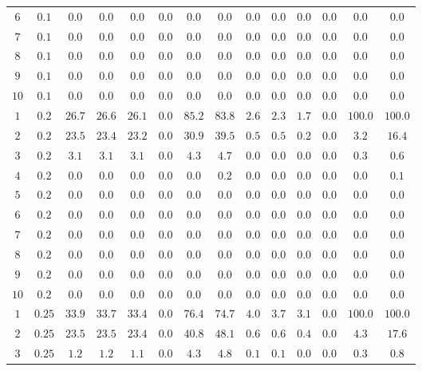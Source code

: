 \begin{tabular}{cccccccccccccc}
$6$ & $0.1$ & $0.0$ & $0.0$ & $0.0$ & $0.0$ & $0.0$ & $0.0$ & $0.0$ & $0.0$ & $0.0$ & $0.0$ & $0.0$ & $0.0$\\
$7$ & $0.1$ & $0.0$ & $0.0$ & $0.0$ & $0.0$ & $0.0$ & $0.0$ & $0.0$ & $0.0$ & $0.0$ & $0.0$ & $0.0$ & $0.0$\\
$8$ & $0.1$ & $0.0$ & $0.0$ & $0.0$ & $0.0$ & $0.0$ & $0.0$ & $0.0$ & $0.0$ & $0.0$ & $0.0$ & $0.0$ & $0.0$\\
$9$ & $0.1$ & $0.0$ & $0.0$ & $0.0$ & $0.0$ & $0.0$ & $0.0$ & $0.0$ & $0.0$ & $0.0$ & $0.0$ & $0.0$ & $0.0$\\
$10$ & $0.1$ & $0.0$ & $0.0$ & $0.0$ & $0.0$ & $0.0$ & $0.0$ & $0.0$ & $0.0$ & $0.0$ & $0.0$ & $0.0$ & $0.0$\\
$1$ & $0.2$ & $26.7$ & $26.6$ & $26.1$ & $0.0$ & $85.2$ & $83.8$ & $2.6$ & $2.3$ & $1.7$ & $0.0$ & $100.0$ & $100.0$\\
$2$ & $0.2$ & $23.5$ & $23.4$ & $23.2$ & $0.0$ & $30.9$ & $39.5$ & $0.5$ & $0.5$ & $0.2$ & $0.0$ & $3.2$ & $16.4$\\
$3$ & $0.2$ & $3.1$ & $3.1$ & $3.1$ & $0.0$ & $4.3$ & $4.7$ & $0.0$ & $0.0$ & $0.0$ & $0.0$ & $0.3$ & $0.6$\\
$4$ & $0.2$ & $0.0$ & $0.0$ & $0.0$ & $0.0$ & $0.0$ & $0.2$ & $0.0$ & $0.0$ & $0.0$ & $0.0$ & $0.0$ & $0.1$\\
$5$ & $0.2$ & $0.0$ & $0.0$ & $0.0$ & $0.0$ & $0.0$ & $0.0$ & $0.0$ & $0.0$ & $0.0$ & $0.0$ & $0.0$ & $0.0$\\
$6$ & $0.2$ & $0.0$ & $0.0$ & $0.0$ & $0.0$ & $0.0$ & $0.0$ & $0.0$ & $0.0$ & $0.0$ & $0.0$ & $0.0$ & $0.0$\\
$7$ & $0.2$ & $0.0$ & $0.0$ & $0.0$ & $0.0$ & $0.0$ & $0.0$ & $0.0$ & $0.0$ & $0.0$ & $0.0$ & $0.0$ & $0.0$\\
$8$ & $0.2$ & $0.0$ & $0.0$ & $0.0$ & $0.0$ & $0.0$ & $0.0$ & $0.0$ & $0.0$ & $0.0$ & $0.0$ & $0.0$ & $0.0$\\
$9$ & $0.2$ & $0.0$ & $0.0$ & $0.0$ & $0.0$ & $0.0$ & $0.0$ & $0.0$ & $0.0$ & $0.0$ & $0.0$ & $0.0$ & $0.0$\\
$10$ & $0.2$ & $0.0$ & $0.0$ & $0.0$ & $0.0$ & $0.0$ & $0.0$ & $0.0$ & $0.0$ & $0.0$ & $0.0$ & $0.0$ & $0.0$\\
$1$ & $0.25$ & $33.9$ & $33.7$ & $33.4$ & $0.0$ & $76.4$ & $74.7$ & $4.0$ & $3.7$ & $3.1$ & $0.0$ & $100.0$ & $100.0$\\
$2$ & $0.25$ & $23.5$ & $23.5$ & $23.4$ & $0.0$ & $40.8$ & $48.1$ & $0.6$ & $0.6$ & $0.4$ & $0.0$ & $4.3$ & $17.6$\\
$3$ & $0.25$ & $1.2$ & $1.2$ & $1.1$ & $0.0$ & $4.3$ & $4.8$ & $0.1$ & $0.1$ & $0.0$ & $0.0$ & $0.3$ & $0.8$\\

\end{tabular}
